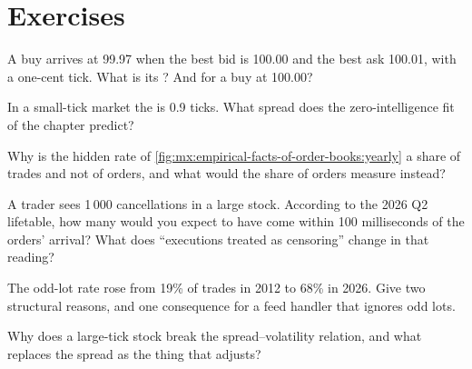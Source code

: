 \section{Exercises}

\begin{exercise}[$\star$]\label{exo:mx:empirical-facts-of-order-books:1}
A buy  arrives at 99.97 when the best bid is 100.00 and the best ask 100.01, with a one-cent tick. What is its ? And
for a buy at 100.00?
\end{exercise}

\begin{exercise}[$\star$]\label{exo:mx:empirical-facts-of-order-books:2}
In a small-tick market the  is 0.9 ticks. What spread does the zero-intelligence fit of the chapter predict?
\end{exercise}

\begin{exercise}[$\star$]\label{exo:mx:empirical-facts-of-order-books:3}
Why is the hidden rate of \cref{fig:mx:empirical-facts-of-order-books:yearly} a share of trades and not of orders, and what would the share of orders
measure instead?
\end{exercise}

\begin{exercise}[$\star\star$]\label{exo:mx:empirical-facts-of-order-books:4}
A trader sees 1\,000 cancellations in a large stock. According to the 2026 Q2 lifetable, how many would you expect to have come within 100 milliseconds
of the orders' arrival? What does ``executions treated as censoring'' change in that reading?
\end{exercise}

\begin{exercise}[$\star\star$]\label{exo:mx:empirical-facts-of-order-books:5}
The odd-lot rate rose from 19\% of trades in 2012 to 68\% in 2026. Give two structural reasons, and one consequence for a feed handler that ignores odd
lots.
\end{exercise}

\begin{exercise}[$\star\star$]\label{exo:mx:empirical-facts-of-order-books:6}
Why does a large-tick stock break the spread--volatility relation, and what replaces the spread as the thing that adjusts?
\end{exercise}

